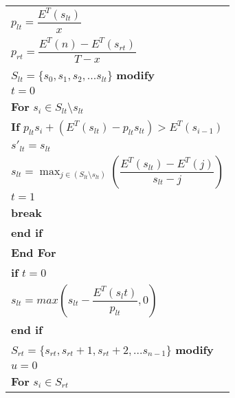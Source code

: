 \begin{table}
\begin{minipage}[b]{8cm}
\begin{tabular}{p{7cm}}
\hspace{4mm}$p_{lt} = \dfrac{E^T(s_{lt})}{x}$
\\
\hspace{4mm}$p_{rt} = \dfrac{E^T(n)-E^T(s_{rt})}{T-x}$
\\
\hspace{4mm}$S_{lt} = \{s_0,s_1,s_2,...s_{lt}\}$ \textbf{modify}
\\
\hspace{4mm}$t=0$
\\
\hspace{4mm}\textbf{For} $s_i \in S_{lt}\setminus s_{lt}$
\\
\hspace{7mm}\textbf{If} $p_{lt}s_i + (E^T(s_{lt}) - p_{lt}s_{lt}) > E^T(s_{i-1})$
\\
\hspace{10mm}$s'_{lt} = s_{lt}$
\\
\hspace{10mm}$s_{lt} = \displaystyle \max_{j\in(S_{lt}\setminus {s_{lt}})}(\dfrac{E^T(s_{lt}) - E^T(j)}{s_{lt}-j})$
\\
\hspace{10mm}$t=1$
\\
\hspace{10mm}\textbf{break}
\\
\hspace{7mm}\textbf{end if}
\\
\hspace{4mm}\textbf{End For}
\\
\hspace{4mm}\textbf{if} $t=0$
\\
\hspace{7mm}$s_{lt} = max(s_{lt} - \dfrac{E^T(s_lt)}{p_{lt}} , 0)$
\\
\hspace{4mm}\textbf{end if}
\\
\hspace{4mm}$S_{rt} = \{s_{rt},s_{rt}+1,s_{rt}+2,...s_{n-1}\}$ \textbf{modify}
\\
\hspace{4mm}$u=0$
\\
\hspace{4mm}\textbf{For} $s_i \in S_{rt}$
\\

\end{tabular}
\end{minipage}
\end{table}
